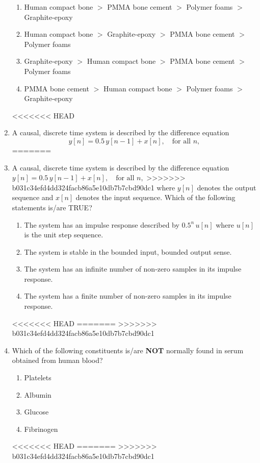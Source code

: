 \documentclass[journal]{IEEEtran}
\begin{document}
\begin{enumerate}
\begin{enumerate}
    \item Human compact bone $>$ PMMA bone cement $>$ Polymer foams $>$ Graphite-epoxy
    \item Human compact bone $>$ Graphite-epoxy $>$ PMMA bone cement $>$ Polymer foams
    \item Graphite-epoxy $>$ Human compact bone $>$ PMMA bone cement $>$ Polymer foams
    \item PMMA bone cement $>$ Human compact bone $>$ Polymer foams $>$ Graphite-epoxy
\end{enumerate}
<<<<<<< HEAD
\hfill{}

\item  A causal, discrete time system is described by the difference equation
\[
y[n] = 0.5 \, y[n - 1] + x[n], \quad \text{for all } n,
\]
=======
\hfill{}

\item  A causal, discrete time system is described by the difference equation
$
y[n] = 0.5 \, y[n - 1] + x[n], \quad \text{for all } n,
$
>>>>>>> b031c34efd4dd324facb86a5e10db7b7cbd90dc1
where \( y[n] \) denotes the output sequence and \( x[n] \) denotes the input sequence.
Which of the following statements is/are TRUE?

\begin{enumerate}
    \item The system has an impulse response described by \( 0.5^n \, u[n] \) where \( u[n] \) is the unit step sequence.
    \item The system is stable in the bounded input, bounded output sense.
    \item The system has an infinite number of non-zero samples in its impulse response.
    \item The system has a finite number of non-zero samples in its impulse response.
\end{enumerate}
<<<<<<< HEAD
\hfill{}
=======
\hfill{}
>>>>>>> b031c34efd4dd324facb86a5e10db7b7cbd90dc1

\item  Which of the following constituents is/are \textbf{NOT} normally found in serum obtained from human blood?

\begin{enumerate}
    \item Platelets
    \item Albumin
    \item Glucose
    \item Fibrinogen
\end{enumerate}
<<<<<<< HEAD
\hfill{}
=======
\hfill{}
>>>>>>> b031c34efd4dd324facb86a5e10db7b7cbd90dc1


\end{enumerate}
\end{document}
